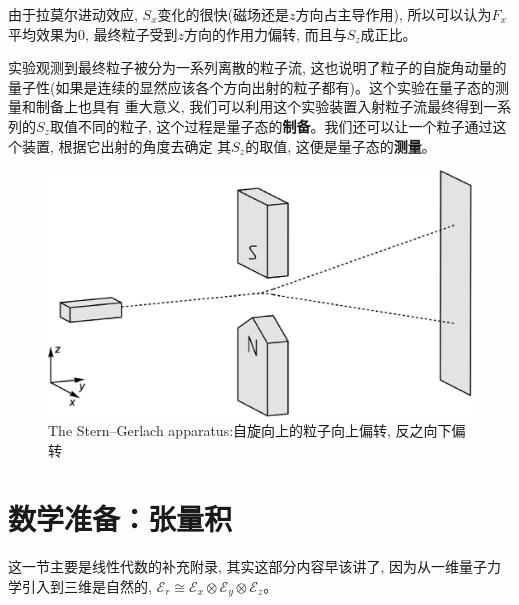 \documentclass[a4paper,zihao=-4,linespread=1]{ctexrep}
\begin{document}
    由于拉莫尔进动效应, $S_x$变化的很快(磁场还是$z$方向占主导作用), 所以可以认为$F_x$平均效果为$0$, 最终粒子受到$z$方向的作用力偏转, 而且与$S_z$成正比。
    
    实验观测到最终粒子被分为一系列离散的粒子流, 这也说明了粒子的自旋角动量的量子性(如果是连续的显然应该各个方向出射的粒子都有)。这个实验在量子态的测量和制备上也具有
    重大意义, 我们可以利用这个实验装置入射粒子流最终得到一系列的$S_z$取值不同的粒子, 这个过程是量子态的\textbf{制备}。我们还可以让一个粒子通过这个装置, 根据它出射的角度去确定
    其$S_z$的取值, 这便是量子态的\textbf{测量}。
    \begin{figure}[htbp]
        \centering
        \includegraphics[scale=0.42]{fig/4-2.eps}
        \caption{The Stern–Gerlach apparatus:自旋向上的粒子向上偏转, 反之向下偏转}
    \end{figure}
    \section{数学准备：张量积}
    这一节主要是线性代数的补充附录, 其实这部分内容早该讲了, 因为从一维量子力学引入到三维是自然的, $\mathscr{E}_r\cong\mathscr{E}_x\otimes\mathscr{E}_y\otimes \mathscr{E}_z $。
    
\end{document}
